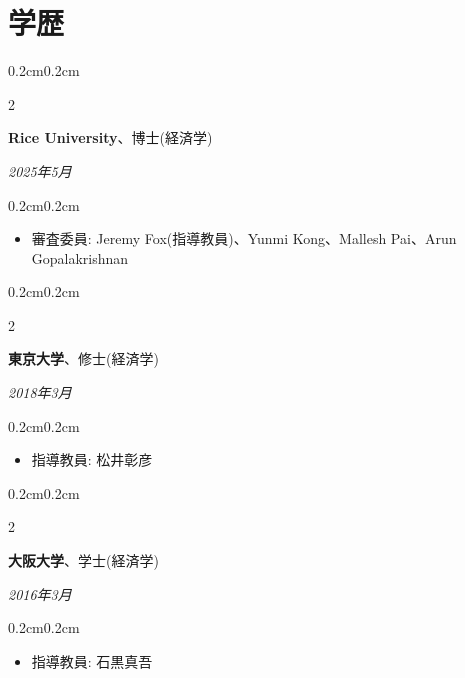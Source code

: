 \documentclass[10pt, letterpaper]{article}
\newenvironment{highlights}{
    \begin{itemize}[
        topsep=0.10cm,
        parsep=0.10cm,
        partopsep=0pt,
        itemsep=0.0cm,
        leftmargin=0.4cm + 10pt
    ]
}{
    \end{itemize}
}
\newenvironment{onecolentry}{
    \begin{adjustwidth}{0.2cm}{0.2cm}
}{
    \end{adjustwidth}
}
\newenvironment{twocolentry}[2][]{
    \onecolentry
    \def\secondColumn{#2}
    \setcolumnwidth{\fill, 4.5cm}
    \begin{paracol}{2}
}{
    \switchcolumn \raggedleft \secondColumn
    \end{paracol}
    \end{adjustwidth}
}
\begin{document}
    \section{学歴}
    \begin{twocolentry}{\textit{2025年5月}}
        \textbf{Rice University}、博士(経済学)
    \end{twocolentry}
    \vspace{0.10cm}
    \begin{onecolentry}
        \begin{highlights}
            \item 審査委員: Jeremy Fox(指導教員)、Yunmi Kong、Mallesh Pai、Arun Gopalakrishnan
        \end{highlights}
    \end{onecolentry}
    \vspace{0.10cm}
    \begin{twocolentry}{\textit{2018年3月}}
        \textbf{東京大学}、修士(経済学)
    \end{twocolentry}
    \vspace{0.10cm}
    \begin{onecolentry}
        \begin{highlights}
            \item 指導教員: 松井彰彦
        \end{highlights}
    \end{onecolentry}
    \vspace{0.10cm}
    \begin{twocolentry}{\textit{2016年3月}}
        \textbf{大阪大学}、学士(経済学)
    \end{twocolentry}
    \vspace{0.10cm}
    \begin{onecolentry}
        \begin{highlights}
            \item 指導教員: 石黒真吾
        \end{highlights}
    \end{onecolentry}
\end{document}
